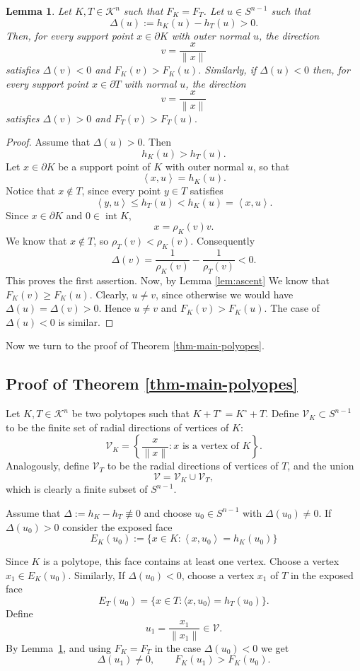\documentclass[12pt]{article}
\newtheorem{lemma}[theorem]{Lemma}
\theoremstyle{remark}
\newcommand{\Kn}{\mathcal{K}^n}
\newcommand{\ip}[2]{\left\langle #1,#2\right\rangle}
\newcommand{\intt}{\operatorname{int}}
\begin{document}
\begin{lemma} \label{lem:sign-flip}
    Let $K,T \in \Kn$ such that $F_K = F_T$. Let $u \in S^{n-1}$ such that 
    \[
    \Delta(u):= h_K(u) - h_T(u) >  0.
    \]
    Then, for every support point $x\in \partial K$ with outer normal $u$, the direction 
    \[
    v = \frac{x}{\|x\|}
    \]
    satisfies $\Delta(v) < 0$ and $F_K(v) > F_K(u)$.
    Similarly, if $\Delta(u) < 0$ then, for every support point $x\in \partial T$ with normal $u$, the direction 
    \[
    v = \frac{x}{\|x\|}
    \]
    satisfies $\Delta(v) > 0$ and $F_T(v) > F_T(u).$
\end{lemma}
\begin{proof}
Assume that \(\Delta(u)>0\).  Then
\[
        h_K(u)>h_T(u).
\]
Let \(x\in \partial K\) be a support point of \(K\) with outer normal \(u\), so that
\[
        \ip{x}{u}=h_K(u).
\]
Notice that $x\not\in T$, since every point \(y\in T\) satisfies
\[
        \ip{y}{u}\le h_T(u)<h_K(u)=\ip{x}{u}.
\]
Since \(x\in\partial K\) and \(0\in\intt K\), 
\[
        x=\rho_K(v)v.
\]
We know that \(x\notin T\), so $\rho_T(v)<\rho_K(v)$.
Consequently
\[
        \Delta(v)=\frac1{\rho_K(v)}-\frac1{\rho_T(v)}<0.
\]
This proves the first assertion. Now, by Lemma \ref{lem:ascent} We know that $F_K(v) \geq F_K(u)$. Clearly, $u\neq v$, since otherwise we would have $\Delta(u)=\Delta(v) > 0$. Hence $u\neq v$ and $F_K(v) > F_K(u).$ The case of $\Delta(u) < 0$ is similar.
\end{proof}


Now we turn to the proof of Theorem \ref{thm-main-polyopes}. 
\subsection{Proof of Theorem \ref{thm-main-polyopes}}
Let $K,T \in \Kn$ be two polytopes such that $K + T^\circ = K^\circ + T.$ Define \(\mathcal V_K\subset S^{n-1}\) to be the finite set of radial directions of
vertices of \(K\):
\[
        \mathcal V_K=
        \left\{\frac{x}{\|x\|}:x\text{ is a vertex of }K\right\}.
\]
Analogously, define \(\mathcal V_T\) to be the radial directions of vertices of $T$, and the union
\[
        \mathcal V=\mathcal V_K\cup\mathcal V_T,
\]
which is clearly a finite subset of \(S^{n-1}\).

Assume that \(\Delta:=h_K - h_T \not\equiv0\) and choose \(u_0\in S^{n-1}\) with \(\Delta(u_0)\ne0\). If $\Delta(u_0) > 0$ consider the exposed face
\[
        E_K(u_0):=\{x\in K:\ip{x}{u_0}=h_K(u_0)\}
\]


 Since \(K\) is a polytope, this face contains at least one vertex.  Choose a
vertex \(x_1\in E_K(u_0).\) 
Similarly, If \(\Delta(u_0)<0\), choose a vertex \(x_1\) of \(T\) in the exposed face
 \[
 E_T(u_0)=\{x\in T:\langle x,u_0\rangle=h_T(u_0)\}.
 \]
Define
\[
        u_1=\frac{x_1}{\|x_1\|}\in\mathcal V.
\]
By Lemma~\ref{lem:sign-flip}, and using \(F_K=F_T\) in the case
  \(\Delta(u_0)<0\) we get
\[
        \Delta(u_1) \neq 0,
        \qquad
        F_K(u_1)>F_K(u_0).
\]
\end{document}

